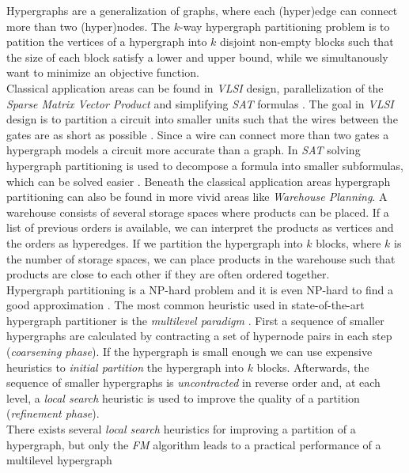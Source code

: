 Hypergraphs are a generalization of graphs, where each (hyper)edge can connect 
more than two (hyper)nodes. The $k$-way hypergraph partitioning problem is to 
patition the vertices of a hypergraph into $k$ disjoint non-empty blocks such
that the size of each block satisfy a lower and upper bound, while we simultanously 
want to minimize an objective function. \\
Classical application areas can be found in \emph{VLSI} design, parallelization of
the \emph{Sparse Matrix Vector Product} and simplifying \emph{SAT} formulas 
\cite{karypis1999multilevel, mann2014formula, papa2007hypergraph}. The goal 
in \emph{VLSI} design is to partition a circuit into smaller units such that
the wires between the gates are as short as possible \cite{bulucc2016recent}.
Since a wire can connect more than two gates a hypergraph models a circuit more
accurate than a graph. In \emph{SAT} solving hypergraph partitioning is used to
decompose a formula into smaller subformulas, which can be solved easier \cite{mann2014formula}.
Beneath the classical application areas hypergraph partitioning can also be found
in more vivid areas like \emph{Warehouse Planning}. A warehouse consists of several
storage spaces where products can be placed. If a list of previous orders is available, 
we can interpret the products as vertices and the orders as hyperedges. If we
partition the hypergraph into $k$ blocks, where $k$ is the number of storage spaces,
we can place products in the warehouse such that products are close to each other if
they are often ordered together.\\
Hypergraph partitioning is a NP-hard problem \cite{lengauer2012combinatorial} and
it is even NP-hard to find a good approximation \cite{bui1992finding}.
The most common heuristic used in state-of-the-art hypergraph partitioner is the
\emph{multilevel paradigm} \cite{catalyurek1999hypergraph, heuer2017improving, karypis1999multilevel}.
First a sequence of smaller hypergraphs are calculated by contracting a set of hypernode pairs
in each step (\emph{coarsening phase}). If the hypergraph is small enough we can use expensive
heuristics to \emph{initial partition} the hypergraph into $k$ blocks. Afterwards, the sequence
of smaller hypergraphs is \emph{uncontracted} in reverse order and, at each level, a 
\emph{local search} heuristic is used to improve the quality of a partition 
(\emph{refinement phase}). \\
There exists several \emph{local search} heuristics for improving a partition of a hypergraph,
but only the \emph{FM} algorithm leads to a practical performance of a multilevel hypergraph
